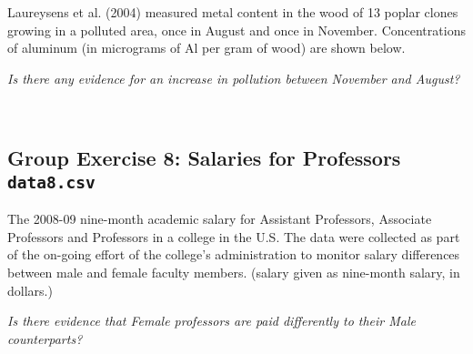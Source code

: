 \documentclass[]{article}
\begin{document}
Laureysens et al. (2004) measured metal content in the wood of 13 poplar
clones growing in a polluted area, once in August and once in November.
Concentrations of aluminum (in micrograms of Al per gram of wood) are
shown below.

{\emph{Is there any evidence for an increase in pollution between
November and August?}}

~

\hypertarget{group-exercise-8-salaries-for-professors-data8.csv}{%
\subsection{\texorpdfstring{Group Exercise 8: Salaries for Professors
\texttt{data8.csv}}{Group Exercise 8: Salaries for Professors data8.csv}}\label{group-exercise-8-salaries-for-professors-data8.csv}}

The 2008-09 nine-month academic salary for Assistant Professors,
Associate Professors and Professors in a college in the U.S. The data
were collected as part of the on-going effort of the college's
administration to monitor salary differences between male and female
faculty members. (salary given as nine-month salary, in dollars.)

{\emph{Is there evidence that Female professors are paid differently to
their Male counterparts?}}
\end{document}
